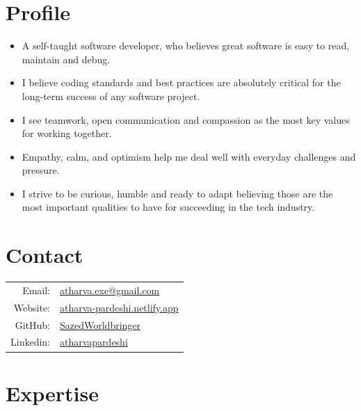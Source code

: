\documentclass[11pt, oneside, a4paper, titlepage]{article}
\begin{document}
\begin{tcolorbox}
  \begin{minipage}[t]{8cm}
    \vspace*{-0.5cm}
    \begin{tcolorbox}[grow to left by=0.6cm,colback=gray!25,colframe=white]

      \section*{Profile}
      \begin{itemize}
        \item{
      A self-taught software developer,
      who believes great software is easy to read,
      maintain and debug.
          }
        \item{
      I believe coding standards and best practices are absolutely critical
      for the long-term success of any software project.
          }
        \item{
      I see teamwork, open communication and compassion
      as the most key values for working together.
          }
        \item{
      Empathy, calm, and optimism
      help me deal well with everyday challenges and pressure.
        }
      \item{
      I strive to be curious, humble and ready to adapt
      believing those are the most important qualities to have
      for succeeding in the tech industry.
        }
      \end{itemize}

      \section*{Contact}
      \begin{tabular}{r l}
        Email: & \href{mailto:atharva.exe@gmail.com}{atharva.exe@gmail.com} \\
        Website: & \href{https://atharva-pardeshi.netlify.app}{atharva-pardeshi.netlify.app} \\
        GitHub: & \href{https://github.com/SazedWorldbringer}{SazedWorldbringer} \\
        Linkedin: & \href{https://linkedin.com/in/atharvapardeshi}{atharvapardeshi} \\
      \end{tabular}

      \section*{Expertise}

\end{tcolorbox}
\end{minipage}
\end{tcolorbox}
\end{document}
